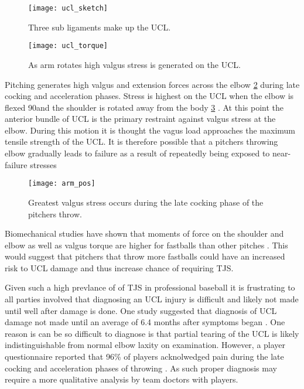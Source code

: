 \begin{figure}[ht]
    \centering
        \texttt{[image: ucl\_sketch]}
    \caption{Three sub ligaments make up the UCL. \cite{Safran2005}}
    \label{fig:ucl_sketch}
\end{figure}

\begin{figure}[hb]
    \centering
        \texttt{[image: ucl\_torque]}
    \caption{As arm rotates high valgus stress is generated on the UCL. \cite{NYTucl}}
    \label{fig:ucl_torque}
\end{figure}

Pitching generates high valgus and extension forces across the elbow \ref{fig:ucl_torque} during late cocking and acceleration phases. Stress is highest on the UCL when the elbow is flexed 90\degree and the shoulder is rotated away from the body \ref{fig:arm_pos} \cite{Fleisig2015}. At this point the anterior bundle of UCL is the primary restraint against valgus stress at the elbow. During this motion it is thought the vagus load approaches the maximum tensile strength of the UCL. It is therefore possible that a pitchers throwing elbow gradually leads to failure as a result of repeatedly being exposed to near-failure stresses \cite{Cain2010}

\begin{figure}[h]
    \centering
        \texttt{[image: arm\_pos]}
    \caption{Greatest valgus stress occurs during the late cocking phase of the pitchers throw. \cite{NYTucl}}
    \label{fig:arm_pos}
\end{figure}

Biomechanical studies have shown that moments of force on the shoulder and elbow as well as valgus torque are higher for fastballs than other pitches \cite{Keller2016}. This would suggest that pitchers that throw more fastballs could have an increased risk to UCL damage and thus increase chance of requiring TJS.

Given such a high prevlance of of TJS in professional baseball it is frustrating to all parties involved that diagnosing an UCL injury is difficult and likely not made until well after damage is done. One study suggested that diagnosis of UCL damage not made until an average of 6.4 months after symptoms began \cite{Cain2010}. One reason is can be so difficult to diagnose is that partial tearing of the UCL is likely indistinguishable from normal elbow laxity on examination. However, a player questionnaire reported that 96\% of players acknolwedged pain during the late cocking and acceleration phases of throwing \cite{Cain2010}. As such proper diagnosis may require a more qualitative analysis by team doctors with players.

